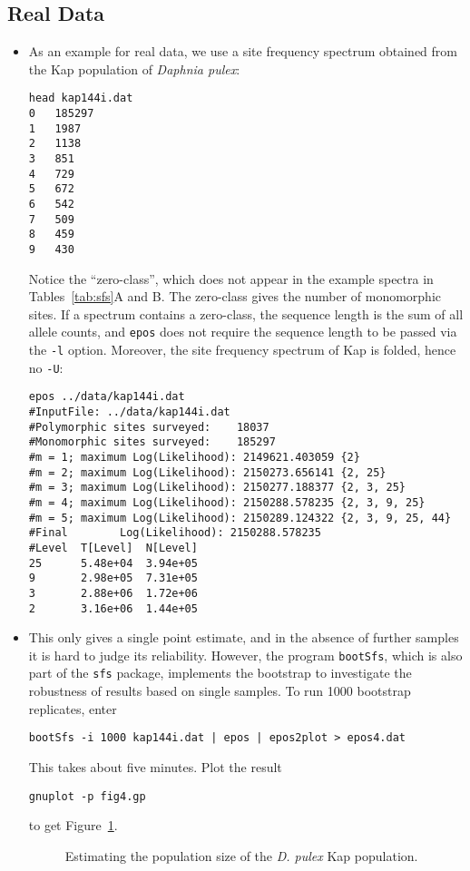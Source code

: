 \documentclass[a4paper, english]{article}
\newcommand{\ty}{\texttt}
\begin{document}
\subsection{Real Data}
\begin{itemize}
\item As an example for real data, we use a site frequency spectrum obtained from
  the Kap population of \textit{Daphnia pulex}:
\begin{verbatim}
head kap144i.dat 
0	185297
1	1987
2	1138
3	851
4	729
5	672
6	542
7	509
8	459
9	430
\end{verbatim}
Notice the ``zero-class'', which does not appear in the example
spectra in Tables~\ref{tab:sfs}A and B. The zero-class gives the
number of monomorphic sites. If a spectrum contains a zero-class, the
sequence length is the sum of all allele counts, and \ty{epos} does not
require the sequence length to be passed via the \ty{-l}
option. Moreover, the site frequency spectrum of Kap is folded, hence
no \ty{-U}:
\begin{verbatim}
epos ../data/kap144i.dat 
#InputFile:	../data/kap144i.dat
#Polymorphic sites surveyed:	18037
#Monomorphic sites surveyed:	185297
#m = 1; maximum Log(Likelihood): 2149621.403059	{2}
#m = 2; maximum Log(Likelihood): 2150273.656141	{2, 25}
#m = 3; maximum Log(Likelihood): 2150277.188377	{2, 3, 25}
#m = 4; maximum Log(Likelihood): 2150288.578235	{2, 3, 9, 25}
#m = 5; maximum Log(Likelihood): 2150289.124322	{2, 3, 9, 25, 44}
#Final        Log(Likelihood): 2150288.578235
#Level  T[Level]  N[Level]
25      5.48e+04  3.94e+05
9       2.98e+05  7.31e+05
3       2.88e+06  1.72e+06
2       3.16e+06  1.44e+05
\end{verbatim}
\item This only gives a single point estimate, and in the absence of
  further samples it is hard to judge its reliability. However,
  the program \ty{bootSfs}, which is also part of the \ty{sfs} package, implements the bootstrap to investigate the robustness of
  results based on single samples. To run 1000 bootstrap replicates, enter
\begin{verbatim}
bootSfs -i 1000 kap144i.dat | epos | epos2plot > epos4.dat
\end{verbatim}
This takes about five minutes. Plot the result
\begin{verbatim}
gnuplot -p fig4.gp
\end{verbatim}
to get Figure~\ref{fig:kap}.
\begin{figure}
  \begin{center}
    \scalebox{0.6}{}
  \end{center}
  \caption{Estimating the population size of the \textit{D. pulex} Kap
    population.}\label{fig:kap}
\end{figure}
\end{itemize}
\end{document}
